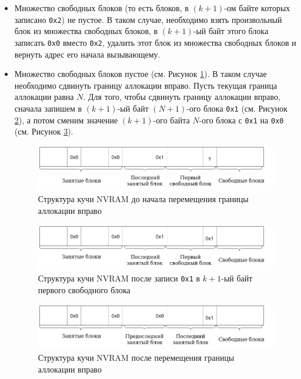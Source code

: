 \documentclass[times,specification,annotation]{itmo-student-thesis}
\begin{document}
\begin{itemize}
    \item Множество свободных блоков (то есть блоков, в $(k + 1)$-ом байте которых записано \texttt{0x2}) не пустое. В таком случае, необходимо взять произвольный блок из множества свободных блоков, в $(k + 1)$-ый байт этого блока записать \texttt{0x0} вместо \texttt{0x2}, удалить этот блок из множества свободных блоков и вернуть адрес его начала вызывающему.
    
    \item Множество свободных блоков пустое (см. Рисунок \ref{before-allocation-pic}). В таком случае необходимо сдвинуть границу аллокации вправо. Пусть текущая граница аллокации равна $N$. Для того, чтобы сдвинуть границу аллокации вправо, сначала запишем в $(k + 1)$-ый байт $(N + 1)$-ого блока \texttt{0x1} (см. Рисунок \ref{allocation-in-progress-pic}), а потом сменим значение $(k + 1)$-ого байта $N$-ого блока с \texttt{0x1} на \texttt{0x0} (см. Рисунок \ref{allocation-finished-pic}).
    
    \begin{figure}[H]
      \centering
      \caption{Структура кучи NVRAM до начала перемещения границы аллокации вправо}
      \label{before-allocation-pic}
      \includegraphics[width=\linewidth]{before_allocation.png}
    \end{figure}
    
    \begin{figure}[H]
      \centering
      \caption{Структура кучи NVRAM после записи \texttt{0x1} в $k + 1$-ый байт первого свободного блока}
      \label{allocation-in-progress-pic}
      \includegraphics[width=\linewidth]{allocation_in_progress.png}
    \end{figure}
    
    \begin{figure}[H]
      \centering
      \caption{Структура кучи NVRAM после перемещения границы аллокации вправо}
      \label{allocation-finished-pic}
      \includegraphics[width=\linewidth]{allocation_finished.png}
    \end{figure}
\end{itemize}
\end{document}
